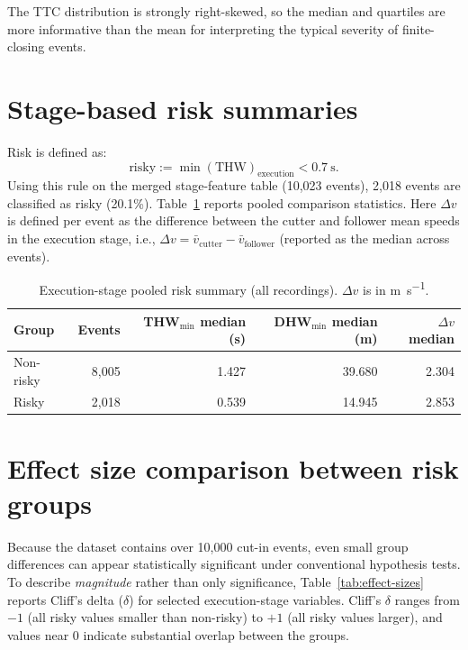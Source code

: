 \documentclass[12pt,a4paper,twoside,openright]{report}
\begin{document}
    The TTC distribution is strongly right-skewed, so the median and quartiles are more informative than the mean for interpreting the typical severity of finite-closing events.

    \section{Stage-based risk summaries}
    Risk is defined as:
    \[
        \text{risky} := \min(\mathrm{THW})_{\text{execution}} < \SI{0.7}{\second}.
    \]
    Using this rule on the merged stage-feature table (10,023 events), 2,018 events are classified as risky (20.1\%). Table~\ref{tab:risk-summary} reports pooled comparison statistics. Here $\Delta v$ is defined per event as the difference between the cutter and follower mean speeds in the execution stage, i.e., $\Delta v = \bar v_{\text{cutter}}-\bar v_{\text{follower}}$ (reported as the median across events).

    \begin{table}[H]
        \centering
        \caption{Execution-stage pooled risk summary (all recordings). $\Delta v$ is in \si{\meter\per\second}.}
        \label{tab:risk-summary}
        {\small
        \setlength{\tabcolsep}{4pt}
            \begin{tabular}{@{}lrrrr@{}}
                \toprule
                Group & Events & THW$_{\min}$ median (s) & DHW$_{\min}$ median (m) & $\Delta v$ median \\
                \midrule
                Non-risky & 8,005 & 1.427 & 39.680 & 2.304 \\
                Risky & 2,018 & 0.539 & 14.945 & 2.853 \\
                \bottomrule
            \end{tabular}}
    \end{table}

    \section{Effect size comparison between risk groups}
    Because the dataset contains over 10{,}000 cut-in events, even small group differences can appear statistically significant under conventional hypothesis tests. To describe \emph{magnitude} rather than only significance, Table~\ref{tab:effect-sizes} reports Cliff's delta ($\delta$) for selected execution-stage variables. Cliff's $\delta$ ranges from $-1$ (all risky values smaller than non-risky) to $+1$ (all risky values larger), and values near $0$ indicate substantial overlap between the groups.
\end{document}
